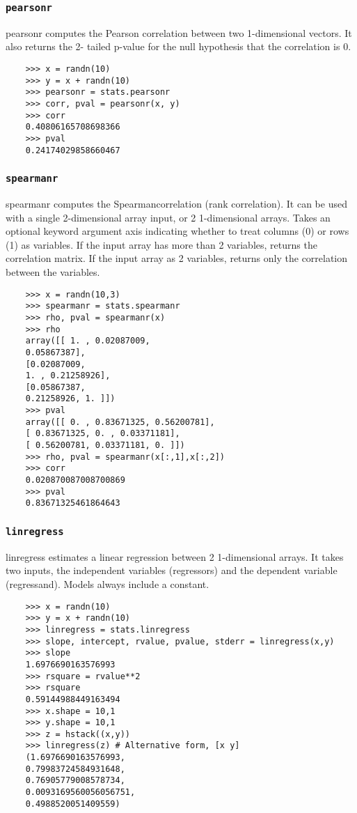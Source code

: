 \documentclass[KSmain.tex]{subfiles}
\begin{document}
\subsubsection*{\texttt{pearsonr}}
pearsonr computes the Pearson correlation between two 1-dimensional vectors. It also returns the 2-
tailed p-value for the null hypothesis that the correlation is 0.
\begin{framed}
	\begin{verbatim}
	>>> x = randn(10)
	>>> y = x + randn(10)
	>>> pearsonr = stats.pearsonr
	>>> corr, pval = pearsonr(x, y)
	>>> corr
	0.40806165708698366
	>>> pval
	0.24174029858660467
	\end{verbatim}
\end{framed}
\subsubsection*{\texttt{spearmanr}}
spearmanr computes the Spearmancorrelation (rank correlation). It can be used with a single 2-dimensional
array input, or 2 1-dimensional arrays. Takes an optional keyword argument axis indicating whether to
treat columns (0) or rows (1) as variables. If the input array has more than 2 variables, returns the correlation
matrix. If the input array as 2 variables, returns only the correlation between the variables.
\begin{framed}
	\begin{verbatim}
	>>> x = randn(10,3)
	>>> spearmanr = stats.spearmanr
	>>> rho, pval = spearmanr(x)
	>>> rho
	array([[ 1. , 0.02087009,
	0.05867387],
	[0.02087009,
	1. , 0.21258926],
	[0.05867387,
	0.21258926, 1. ]])
	>>> pval
	array([[ 0. , 0.83671325, 0.56200781],
	[ 0.83671325, 0. , 0.03371181],
	[ 0.56200781, 0.03371181, 0. ]])
	>>> rho, pval = spearmanr(x[:,1],x[:,2])
	>>> corr
	0.020870087008700869
	>>> pval
	0.83671325461864643
	\end{verbatim}
\end{framed}
\subsubsection*{\texttt{linregress}}
linregress estimates a linear regression between 2 1-dimensional arrays. It takes two inputs, the independent
variables (regressors) and the dependent variable (regressand). Models always include a constant.
\begin{framed}
	\begin{verbatim}
	>>> x = randn(10)
	>>> y = x + randn(10)
	>>> linregress = stats.linregress
	>>> slope, intercept, rvalue, pvalue, stderr = linregress(x,y)
	>>> slope
	1.6976690163576993
	>>> rsquare = rvalue**2
	>>> rsquare
	0.59144988449163494
	>>> x.shape = 10,1
	>>> y.shape = 10,1
	>>> z = hstack((x,y))
	>>> linregress(z) # Alternative form, [x y]
	(1.6976690163576993,
	0.79983724584931648,
	0.76905779008578734,
	0.0093169560056056751,
	0.4988520051409559)
	
	\end{verbatim}
\end{framed}
\end{document}

